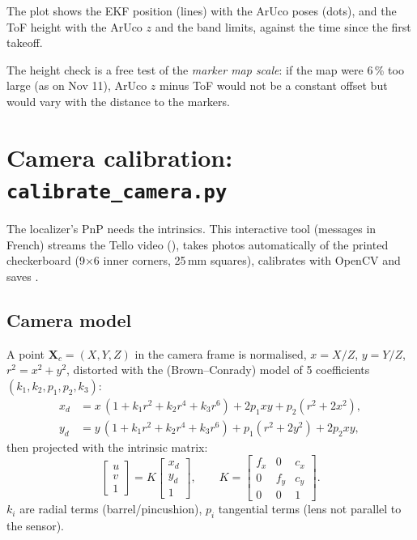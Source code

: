 The plot shows the EKF position (lines) with the ArUco poses (dots), and the ToF height with the ArUco $z$ and the
band limits, against the time since the first takeoff.

\begin{intuition}
The height check is a free test of the \emph{marker map scale}: if the map were 6\,\% too large (as on Nov 11),
ArUco $z$ minus ToF would not be a constant offset but would vary with the distance to the markers.
\end{intuition}

\section{Camera calibration: \texorpdfstring{\texttt{calibrate\_camera.py}}{calibrate\_camera.py}}

The localizer's PnP needs the intrinsics. This interactive tool (messages in French) streams the Tello video
(), takes photos automatically of the printed checkerboard (9$\times$6 inner
corners, 25\,mm squares), calibrates with OpenCV and saves .

\subsection{Camera model}

A point $\mathbf X_c = (X, Y, Z)$ in the camera frame is normalised, $x = X/Z$, $y = Y/Z$, $r^2 = x^2+y^2$,
distorted with the  (Brown--Conrady) model of 5 coefficients $(k_1, k_2, p_1, p_2, k_3)$:
$$
\begin{aligned}
x_d &= x\,(1 + k_1 r^2 + k_2 r^4 + k_3 r^6) + 2p_1 xy + p_2(r^2 + 2x^2),\\
y_d &= y\,(1 + k_1 r^2 + k_2 r^4 + k_3 r^6) + p_1(r^2 + 2y^2) + 2p_2 xy,
\end{aligned}
$$
then projected with the intrinsic matrix:
$$
\begin{bmatrix} u \\ v \\ 1 \end{bmatrix} = K \begin{bmatrix} x_d \\ y_d \\ 1 \end{bmatrix},\qquad
K = \begin{bmatrix} f_x & 0 & c_x \\ 0 & f_y & c_y \\ 0 & 0 & 1 \end{bmatrix}.
$$
$k_i$ are radial terms (barrel/pincushion), $p_i$ tangential terms (lens not parallel to the sensor).

